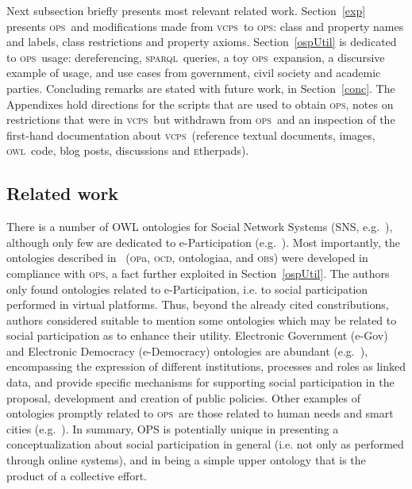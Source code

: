 \documentclass[10pt,letterpaper]{article}
\newcommand{\ops}{\textsc{ops}}
\newcommand{\vcps}{\textsc{vcps}}
\newcommand{\owl}{\textsc{owl}}
\newcommand{\sparql}{\textsc{sparql}}
\newcommand{\etherpad}{\textsc{e}therpad}
\newcommand{\opa}{\textsc{op}a}
\newcommand{\ocd}{\textsc{ocd}}
\newcommand{\ontologiaa}{\textsc{o}ntologiaa}
\newcommand{\obs}{\textsc{obs}}
\begin{document}
Next subsection briefly presents most relevant related work.
Section~\ref{exp} presents \ops\ and modifications made from \vcps\ to \ops: class and property names and labels,
class restrictions and property axioms.
Section~\ref{ospUtil} is dedicated to \ops\ usage: dereferencing, \sparql\ queries,
a toy \ops\ expansion, a discursive example of usage, and use cases from government,
civil society and academic parties.
Concluding remarks are stated with future work, in Section~\ref{conc}. 
The Appendixes hold directions for the scripts that are used to obtain \ops,
notes on restrictions that were in \vcps\ but withdrawn from \ops\, and an inspection of the first-hand
documentation about \vcps\ (reference textual documents, images, \owl\ code, blog posts, discussions and \etherpad s).

\subsection{Related work}\label{srel}
There is a number of OWL ontologies for Social Network Systems (SNS, e.g.~\cite{sns1,sns2,sns3}),
although only few are dedicated to e-Participation (e.g.~\cite{ep1,ep2,ep3}).
Most importantly, the ontologies described in~\cite{pnud5} (\opa, \ocd, \ontologiaa, and \obs) were developed in compliance with \ops,
a fact further exploited in Section~\ref{ospUtil}.
The authors only found ontologies related to e-Participation, i.e. to social participation
performed in virtual platforms.
Thus, beyond the already cited constributions, authors considered suitable to mention some ontologies which may be related to social participation
as to enhance their utility.
Electronic Government (e-Gov) and Electronic Democracy (e-Democracy) ontologies are abundant (e.g.~\cite{ed1,ed2,ed3,ed4,eg1,eg2,eg3,eg4,eg5,eg6}), encompassing the expression of different institutions, processes and roles as linked data, and provide specific mechanisms for supporting social participation in the proposal, development and creation of public policies.
Other examples of ontologies promptly related to \ops\ are those related to human needs and smart cities (e.g.~\cite{sc1,hn}).
In summary, OPS is potentially unique in presenting a conceptualization about social participation in general
(i.e. not only as performed through online systems),
and in being a simple upper ontology that is the product of a collective effort.



\end{document}
